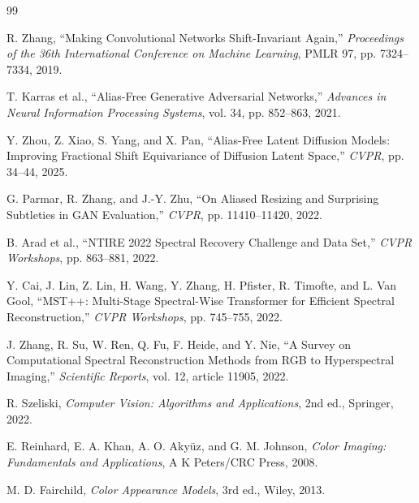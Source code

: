 \begin{thebibliography}{99}
\begin{LTR}
R. Zhang,
``Making Convolutional Networks Shift-Invariant Again,''
\emph{Proceedings of the 36th International Conference on Machine Learning},
PMLR 97, pp. 7324--7334, 2019.

T. Karras et al.,
``Alias-Free Generative Adversarial Networks,''
\emph{Advances in Neural Information Processing Systems}, vol. 34, pp. 852--863, 2021.

Y. Zhou, Z. Xiao, S. Yang, and X. Pan,
``Alias-Free Latent Diffusion Models: Improving Fractional Shift Equivariance of Diffusion Latent Space,''
\emph{CVPR}, pp. 34--44, 2025.

G. Parmar, R. Zhang, and J.-Y. Zhu,
``On Aliased Resizing and Surprising Subtleties in GAN Evaluation,''
\emph{CVPR}, pp. 11410--11420, 2022.

B. Arad et al.,
``NTIRE 2022 Spectral Recovery Challenge and Data Set,''
\emph{CVPR Workshops}, pp. 863--881, 2022.

Y. Cai, J. Lin, Z. Lin, H. Wang, Y. Zhang, H. Pfister, R. Timofte, and L. Van Gool,
``MST++: Multi-Stage Spectral-Wise Transformer for Efficient Spectral Reconstruction,''
\emph{CVPR Workshops}, pp. 745--755, 2022.

J. Zhang, R. Su, W. Ren, Q. Fu, F. Heide, and Y. Nie,
``A Survey on Computational Spectral Reconstruction Methods from RGB to Hyperspectral Imaging,''
\emph{Scientific Reports}, vol. 12, article 11905, 2022.

R. Szeliski,
\emph{Computer Vision: Algorithms and Applications}, 2nd ed., Springer, 2022.

E. Reinhard, E. A. Khan, A. O. Akyüz, and G. M. Johnson,
\emph{Color Imaging: Fundamentals and Applications}, A K Peters/CRC Press, 2008.

M. D. Fairchild,
\emph{Color Appearance Models}, 3rd ed., Wiley, 2013.

\end{LTR}
\end{thebibliography}
